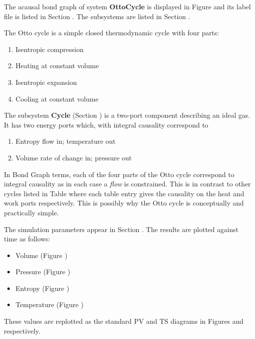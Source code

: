 
%

   The acausal bond graph of system \textbf{OttoCycle} is
   displayed in Figure  and its label
   file is listed in Section .
   The subsystems are listed in Section .


The Otto cycle is a simple closed thermodynamic cycle with four parts:
\begin{enumerate}
\item Isentropic compression
\item Heating at constant volume
\item Isentropic expansion
\item Cooling at constant volume
\end{enumerate}

The subsystem \textbf{Cycle} (Section ) is a two-port
component describing an ideal gas. It has two energy ports which, with
integral causality correspond to
\begin{enumerate}
\item Entropy flow in; temperature out
\item Volume rate of change in; pressure out
\end{enumerate}

In Bond Graph terms, each of the four parts of the Otto cycle
correspond to integral causality as in each case a \emph{flow} is
constrained. This is in contrast to other cycles listed in Table
 where each table entry gives the causality on the
heat and work ports respectively. This is possibly why the Otto cycle
is conceptually and practically simple.

The simulation parameters appear in Section
. The results are plotted against time
as follows:
\begin{itemize}
\item Volume (Figure )
\item Pressure (Figure
)
\item Entropy (Figure )
\item Temperature (Figure
)
\end{itemize}

These values are replotted as the standard PV and TS diagrams in
Figures
and
respectively.





